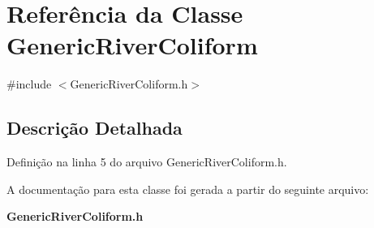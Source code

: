 \section{Referência da Classe Generic\+River\+Coliform}
\label{class_generic_river_coliform}


{\ttfamily \#include $<$Generic\+River\+Coliform.\+h$>$}



\subsection{Descrição Detalhada}


Definição na linha 5 do arquivo Generic\+River\+Coliform.\+h.



A documentação para esta classe foi gerada a partir do seguinte arquivo\+:\begin{DoxyCompactItemize}
\item 
{\bf Generic\+River\+Coliform.\+h}\end{DoxyCompactItemize}
